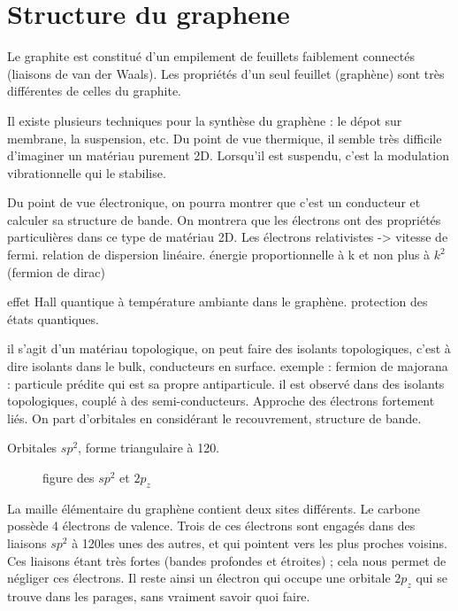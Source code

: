 \chapter{Structure du graphene}

Le graphite est constitué d'un empilement de feuillets faiblement connectés
(liaisons de van der Waals). Les propriétés d'un seul feuillet (graphène) sont
très différentes de celles du graphite.

Il existe plusieurs techniques pour la synthèse du graphène : le dépot sur
membrane, la suspension, etc.
Du point de vue thermique, il semble très difficile d'imaginer un matériau
purement 2D. Lorsqu'il est suspendu, c'est la modulation vibrationnelle qui le
stabilise.

Du point de vue électronique, on pourra montrer que c'est un conducteur et
calculer sa structure de bande. On montrera que les électrons ont des propriétés
particulières dans ce type de matériau 2D. Les électrons relativistes -> vitesse
de fermi.
relation de dispersion linéaire. énergie proportionnelle à k et non plus à $k^2$
(fermion de dirac)

effet Hall quantique à température ambiante dans le graphène.
protection des états quantiques.

il s'agit d'un matériau topologique, on peut faire des isolants topologiques,
c'est à dire isolants dans le bulk, conducteurs en surface. exemple : fermion de
majorana : particule prédite qui est sa propre antiparticule. il est observé dans
des isolants topologiques, couplé à des semi-conducteurs.
Approche des électrons fortement liés. On part d'orbitales en considérant le
recouvrement, structure de bande.

Orbitales $sp^2$, forme triangulaire à 120\textdegree.

\begin{figure}
    \TODO
    \caption{figure des $sp^2$ et $2p_z$}
    \label{fig:orbitales}
\end{figure}

La maille élémentaire du graphène contient deux sites différents. Le carbone
possède 4 électrons de valence. Trois de ces électrons sont engagés dans des
liaisons $sp^2$ à 120\textdegree les unes des autres, et qui pointent vers les
plus proches voisins. Ces liaisons étant très fortes (bandes profondes et
étroites) ; cela nous permet de négliger ces électrons. Il reste ainsi un
électron qui occupe une orbitale $2p_z$ qui se trouve dans les parages, sans
vraiment savoir quoi faire.


